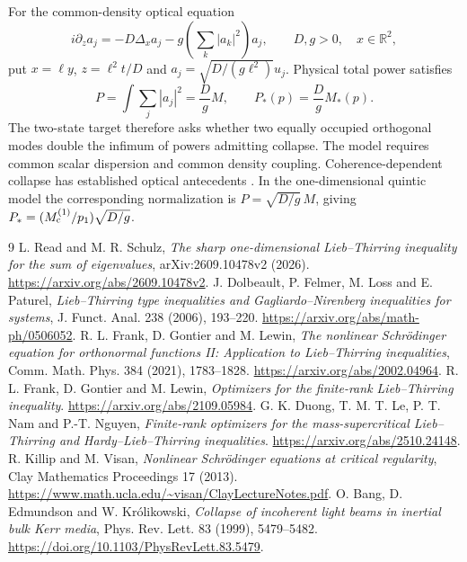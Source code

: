 \documentclass[11pt,a4paper]{article}
\newcommand{\R}{\mathbb R}
\begin{document}
For the common-density optical equation
\[
 i\partial_za_j=-D\Delta_xa_j-g\left(\sum_k|a_k|^2\right)a_j,
 \qquad D,g>0,\quad x\in\R^2,
\]
put $x=\ell y$, $z=\ell^2t/D$ and $a_j=\sqrt{D/(g\ell^2)}u_j$. Physical total power satisfies
\[
 P=\int\sum_j|a_j|^2=\frac DgM,\qquad P_*(p)=\frac DgM_*(p).
\]
The two-state target therefore asks whether two equally occupied orthogonal modes double the infimum of powers admitting collapse. The model requires common scalar dispersion and common density coupling. Coherence-dependent collapse has established optical antecedents \cite{Bang}. In the one-dimensional quintic model the corresponding normalization is $P=\sqrt{D/g}\,M$, giving $P_*=(M_{\rm c}^{(1)}/p_1)\sqrt{D/g}$.

\begin{thebibliography}{9}
 L. Read and M. R. Schulz, \emph{The sharp one-dimensional Lieb--Thirring inequality for the sum of eigenvalues}, arXiv:2609.10478v2 (2026). \url{https://arxiv.org/abs/2609.10478v2}.
 J. Dolbeault, P. Felmer, M. Loss and E. Paturel, \emph{Lieb--Thirring type inequalities and Gagliardo--Nirenberg inequalities for systems}, J. Funct. Anal. 238 (2006), 193--220. \url{https://arxiv.org/abs/math-ph/0506052}.
 R. L. Frank, D. Gontier and M. Lewin, \emph{The nonlinear Schr\"odinger equation for orthonormal functions II: Application to Lieb--Thirring inequalities}, Comm. Math. Phys. 384 (2021), 1783--1828. \url{https://arxiv.org/abs/2002.04964}.
 R. L. Frank, D. Gontier and M. Lewin, \emph{Optimizers for the finite-rank Lieb--Thirring inequality}. \url{https://arxiv.org/abs/2109.05984}.
 G. K. Duong, T. M. T. Le, P. T. Nam and P.-T. Nguyen, \emph{Finite-rank optimizers for the mass-supercritical Lieb--Thirring and Hardy--Lieb--Thirring inequalities}. \url{https://arxiv.org/abs/2510.24148}.
 R. Killip and M. Visan, \emph{Nonlinear Schr\"odinger equations at critical regularity}, Clay Mathematics Proceedings 17 (2013). \url{https://www.math.ucla.edu/~visan/ClayLectureNotes.pdf}.
 O. Bang, D. Edmundson and W. Kr\'olikowski, \emph{Collapse of incoherent light beams in inertial bulk Kerr media}, Phys. Rev. Lett. 83 (1999), 5479--5482. \url{https://doi.org/10.1103/PhysRevLett.83.5479}.
\end{thebibliography}
\end{document}
